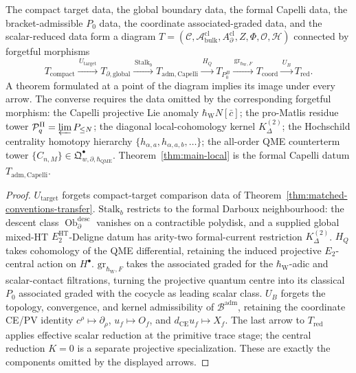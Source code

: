 \documentclass[11pt]{memoir}
\begin{document}
\begin{prop}\label{prop:monotone-strength-tower}
  The compact target data, the global boundary data, the formal
  Capelli data, the bracket-admissible \(P_0\) data, the coordinate
  associated-graded data, and the scalar-reduced data form a diagram
  $T=(\mathcal C,\mathcal A^{\mathrm{cl}}_{\mathrm{bulk}},
  A^{\mathrm{cl}}_\partial,Z,\Phi,\mathcal O,\mathcal H)$ connected
  by forgetful morphisms
  \[
    T_{\mathrm{compact}}
    \xrightarrow{\,U_{\mathrm{target}}\,}
    T_{\partial,\mathrm{global}}
    \xrightarrow{\,\mathrm{Stalk}_b\,}
    T_{\mathrm{adm,Capelli}}
    \xrightarrow{\,H_Q\,}
    T_{P_0^B}
    \xrightarrow{\,\mathrm{gr}_{\hbar_{\mathrm{W}},F}\,}
    T_{\mathrm{coord}}
    \xrightarrow{\,U_B\,}
    T_{\mathrm{red}}.
  \]
  A theorem formulated at a point of the diagram implies its image under
  every arrow.  The converse requires the data omitted by the
  corresponding forgetful morphism:
  the Capelli projective Lie anomaly \(\hbar_{\mathrm{W}}N[\bar c]\);
  the pro-Matlis residue tower $\mathcal P_q^\Pi=\varprojlim P_{\leq N}$; the
  diagonal local-cohomology kernel $K^{(2)}_\Delta$; the Hochschild
  centrality homotopy hierarchy
  $\{h_{\alpha,a},h_{\alpha,a,b},\dots\}$; the all-order QME
  counterterm tower
  $\{C_{n,M}\}\in\mathfrak Q^\bullet_{w,\partial,\hbar_{\mathrm{QME}}}$.
  Theorem~\ref{thm:main-local} is the formal Capelli datum
  $T_{\mathrm{adm,Capelli}}$.
\end{prop}

\begin{proof}
  $U_{\mathrm{target}}$ forgets compact-target comparison data of
  Theorem~\ref{thm:matched-conventions-transfer}.  $\mathrm{Stalk}_b$
  restricts to the formal Darboux neighbourhood: the descent class
  $\operatorname{Ob}^{\mathrm{desc}}_{\partial}$ vanishes on a
  contractible polydisk, and a supplied global mixed-HT
  \(E_2^{\mathrm{HT}}\)-Deligne datum has arity-two formal-current restriction
  \(K^{(2)}_\Delta\).  $H_Q$ takes
  cohomology of the QME differential, retaining the induced
  projective $E_2$-central action on $H^\bullet$.
  \(\mathrm{gr}_{\hbar_{\mathrm{W}},F}\) takes the associated graded for the
  \(\hbar_{\mathrm{W}}\)-adic and scalar-contact filtrations, turning the
  projective quantum centre into its classical $P_0$ associated graded with
  the cocycle as leading scalar class.  $U_B$ forgets the topology,
  convergence, and kernel admissibility of $\mathcal B^{\mathrm{adm}}$,
  retaining the coordinate CE/PV identity
  $c^\rho\mapsto\partial_\rho$, $u_f\mapsto O_f$, and
  $d_{\mathrm{CE}}u_f\mapsto X_f$.  The last arrow to
  $T_{\mathrm{red}}$ applies effective scalar reduction at the primitive
  trace stage; the central reduction \(K=0\) is a separate projective
  specialization.  These are exactly the components omitted by the
  displayed arrows.
\end{proof}
\end{document}
